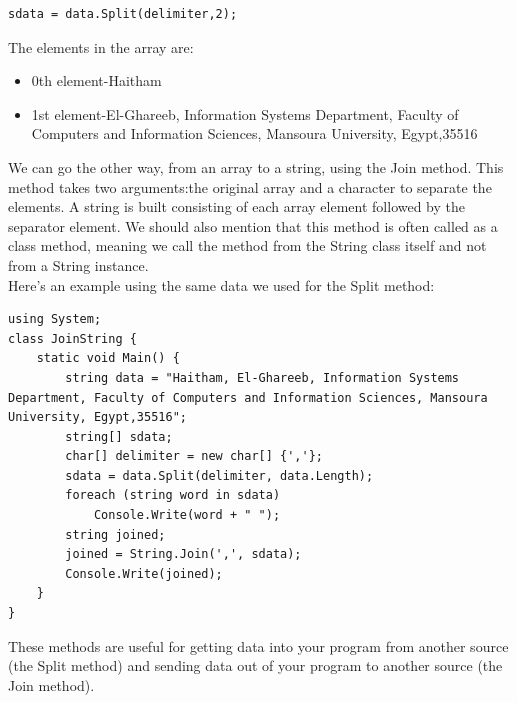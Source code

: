 \documentclass[12pt,a4paper,final,twoside,titlepage]{book}
\begin{document}
\begin{lstlisting}
sdata = data.Split(delimiter,2);
\end{lstlisting}
The elements in the array are:
\begin{itemize}
\item 0th element-Haitham
\item 1st element-El-Ghareeb, Information Systems Department, Faculty of Computers and Information Sciences, Mansoura University, Egypt,35516
\end{itemize}
We can go the other way, from an array to a string, using the Join method. This method takes two arguments:the original array and a character to separate the elements. A string is built consisting of each array element followed by the separator element. We should also mention that this method is often called as a class method, meaning we call the method from the String class itself and not from a String instance.\\
Here’s an example using the same data we used for the Split method:
\begin{lstlisting}
using System; 
class JoinString {
	static void Main() {
		string data = "Haitham, El-Ghareeb, Information Systems Department, Faculty of Computers and Information Sciences, Mansoura University, Egypt,35516";
      	string[] sdata;
		char[] delimiter = new char[] {','};
		sdata = data.Split(delimiter, data.Length); 
		foreach (string word in sdata)
        	Console.Write(word + " ");
      	string joined;
      	joined = String.Join(',', sdata);
      	Console.Write(joined);
	} 
}
\end{lstlisting}
These methods are useful for getting data into your program from another source (the Split method) and sending data out of your program to another source (the Join method).
\end{document}
